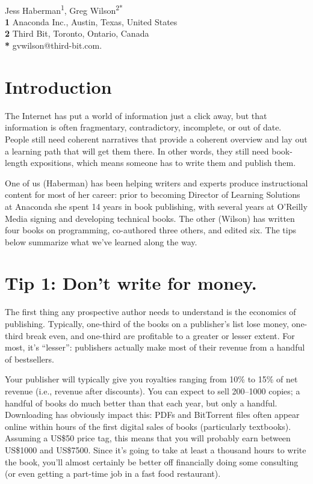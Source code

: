 \documentclass[10pt,letterpaper]{article}
\begin{document}
\vspace*{0.2in}

\begin{flushleft}
{\Large
\textbf{}
}
\newline
\\
{Jess Haberman}\textsuperscript{1},
{Greg Wilson}\textsuperscript{2*}
\\
\bigskip
\textbf{1} Anaconda Inc., Austin, Texas, United States\\
\textbf{2} Third Bit, Toronto, Ontario, Canada\\
\textbf{*} gvwilson@third-bit.com.
\end{flushleft}

\section*{Introduction}

The Internet has put a world of information just a click away,
but that information is often fragmentary, contradictory, incomplete, or out of date.
People still need coherent narratives that provide a coherent overview
and lay out a learning path that will get them there.
In other words,
they still need book-length expositions,
which means someone has to write them and publish them.

One of us (Haberman) has been helping writers and experts produce instructional content for most of her career:
prior to becoming Director of Learning Solutions at Anaconda she spent 14 years in book publishing,
with several years at O'Reilly Media signing and developing technical books.
The other (Wilson) has written four books on programming,
co-authored three others,
and edited six.
The tips below summarize what we've learned along the way.

\section*{Tip 1: Don't write for money.}

The first thing any prospective author needs to understand is
the economics of publishing.
Typically,
one-third of the books on a publisher's list lose money,
one-third break even,
and one-third are profitable to a greater or lesser extent.
For most, it's ``lesser'':
publishers actually make most of their revenue from a handful of bestsellers.

Your publisher will typically give you royalties ranging from 10\% to 15\% of net revenue
(i.e., revenue after discounts).
You can expect to sell 200–1000 copies;
a handful of books do much better than that each year,
but only a handful.
Downloading has obviously impact this:
PDFs and BitTorrent files often appear online
within hours of the first digital sales of books (particularly textbooks).
Assuming a US\$50 price tag,
this means that you will probably earn between US\$1000 and US\$7500.
Since it's going to take at least a thousand hours to write the book,
you'll almost certainly be better off financially doing some consulting
(or even getting a part-time job in a fast food restaurant).
\end{document}
